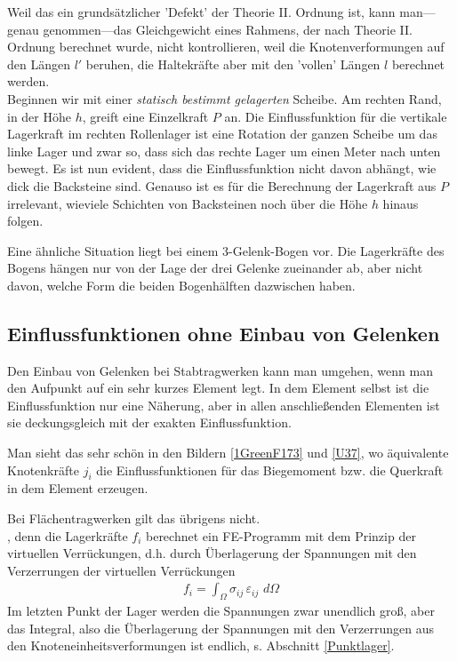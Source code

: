 {Weil das ein grunds\"{a}tzlicher 'Defekt' der Theorie II. Ordnung ist, kann man---genau genommen---das Gleichgewicht eines Rahmens, der nach Theorie II. Ordnung berechnet wurde, nicht kontrollieren, weil  die Knotenverformungen auf den L\"{a}ngen $l'$ beruhen, die Haltekr\"{a}fte aber mit den 'vollen' L\"{a}ngen $l$ berechnet werden.
\\

Beginnen wir mit einer {\em statisch bestimmt gelagerten\/} Scheibe. Am rechten Rand, in der H\"{o}he $h$, greift eine Einzelkraft $P$ an. Die Einflussfunktion f\"{u}r die vertikale Lagerkraft im rechten Rollenlager ist eine Rotation der ganzen Scheibe um das linke Lager und zwar so, dass sich das rechte Lager um einen Meter nach unten bewegt. Es ist nun evident, dass die Einflussfunktion nicht davon abh\"{a}ngt, wie dick die Backsteine sind. Genauso ist es f\"{u}r die Berechnung der Lagerkraft aus $P$ irrelevant, wieviele Schichten von Backsteinen noch \"{u}ber die H\"{o}he $h$ hinaus folgen.

Eine \"{a}hnliche Situation liegt bei einem 3-Gelenk-Bogen vor. Die Lagerkr\"{a}fte des Bogens h\"{a}ngen nur von der Lage der drei Gelenke zueinander ab, aber nicht davon, welche Form die beiden Bogenh\"{a}lften dazwischen haben.\\

{\textcolor{blau2}{\section{Einflussfunktionen ohne Einbau von Gelenken}}}
Den Einbau von Gelenken bei Stabtragwerken kann man umgehen, wenn man den Aufpunkt auf ein sehr kurzes Element legt. In dem Element selbst ist die Einflussfunktion nur eine N\"{a}herung, aber in allen anschlie{\ss}enden Elementen ist sie deckungsgleich mit der exakten Einflussfunktion.

Man sieht das sehr sch\"{o}n in den Bildern \ref{1GreenF173} und \ref{U37}, wo \"{a}quivalente Knotenkr\"{a}fte $j_i $ die Einflussfunktionen f\"{u}r das Biegemoment bzw. die Querkraft in dem Element erzeugen.

Bei Fl\"{a}chentragwerken gilt das \"{u}brigens nicht.
\\

, denn die Lagerkr\"{a}fte $f_i$ berechnet ein FE-Programm mit dem Prinzip der virtuellen Verr\"{u}ckungen, d.h. durch \"{U}berlagerung der Spannungen mit den Verzerrungen der virtuellen Verr\"{u}ckungen
\begin{align}
f_i = \int_{\Omega} \sigma_{ij} \,\varepsilon_{ij}\,\,d\Omega
\end{align}
Im letzten Punkt der Lager werden die Spannungen zwar unendlich gro{\ss}, aber das Integral, also die \"{U}berlagerung der Spannungen mit den Verzerrungen aus den Knoteneinheitsverformungen ist endlich, s. Abschnitt \ref{Punktlager}.

}
